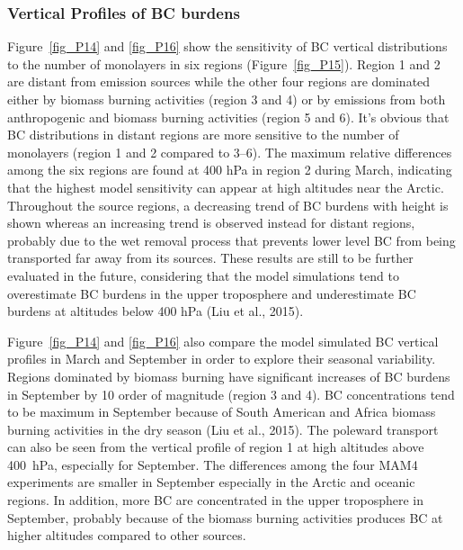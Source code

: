 \documentclass[12pt]{article}
\begin{document}
	\subsubsection{Vertical Profiles of BC burdens}
	Figure~\ref{fig_P14} and \ref{fig_P16} show the sensitivity of BC vertical distributions to the number of monolayers in six regions (Figure~\ref{fig_P15}). Region 1 and 2 are distant from emission sources while the other four regions are dominated either by biomass burning activities (region 3 and 4) or by emissions from both anthropogenic and biomass burning activities (region 5 and 6). It's obvious that BC distributions in distant regions are more sensitive to the number of monolayers (region 1 and 2 compared to 3--6). The maximum relative differences among the six regions are found at 400 hPa in region 2 during March, indicating that the highest model sensitivity can appear at high altitudes near the Arctic. Throughout the source regions, a decreasing trend of BC burdens with height is shown whereas an increasing trend is observed instead for distant regions, probably due to the wet removal process that prevents lower level BC from being transported far away from its sources. These results are still to be further evaluated in the future, considering that the model simulations tend to overestimate BC burdens in the upper troposphere and underestimate BC burdens at altitudes below 400 hPa (Liu et al., 2015). 
	
	Figure~\ref{fig_P14} and \ref{fig_P16} also compare the model simulated BC vertical profiles in March and September in order to explore their seasonal variability. Regions dominated by biomass burning have significant increases of BC burdens in September by 10 order of magnitude (region 3 and 4). BC concentrations tend to be maximum in September because of South American and Africa biomass burning activities in the dry season (Liu et al., 2015). The poleward transport can also be seen from the vertical profile of region 1 at high altitudes above 400~hPa, especially for September. The differences among the four MAM4 experiments are smaller in September especially in the Arctic and oceanic regions. In addition, more BC are concentrated in the upper troposphere in September, probably because of the biomass burning activities produces BC at higher altitudes compared to other sources. 
	
\end{document}
